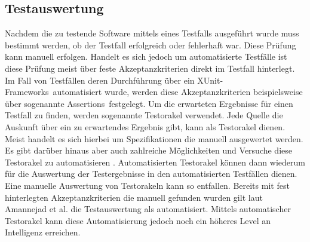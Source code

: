 \subsection{Testauswertung}
\label{subsec:testauswertung}
Nachdem die zu testende Software mittels eines Testfalls ausgeführt wurde muss bestimmt werden, ob der Testfall erfolgreich oder fehlerhaft war. Diese Prüfung kann manuell erfolgen. Handelt es sich jedoch um automatisierte Testfälle ist diese Prüfung meist über feste Akzeptanzkriterien direkt im Testfall hinterlegt. Im Fall von Testfällen deren Durchführung über ein \grq XUnit-Frameworks\grq\ automatisiert wurde, werden diese Akzeptanzkriterien beispielsweise über sogenannte \grq Assertions\grq\ festgelegt.
Um die erwarteten Ergebnisse für einen Testfall zu finden, werden sogenannte Testorakel verwendet.
Jede Quelle die Auskunft über ein zu erwartendes Ergebnis gibt, kann als Testorakel dienen.
Meist handelt es sich hierbei um Spezifikationen die manuell ausgewertet werden.
Es gibt darüber hinaus aber auch zahlreiche Möglichkeiten und Versuche diese Testorakel zu automatisieren \cite{memon_automated_2000} \cite{richardson_specification-based_1992} \cite{shahamiri_comparative_2009}.
Automatisierten Testorakel können dann wiederum für die Auswertung der Testergebnisse in den automatisierten Testfällen dienen. Eine manuelle Auswertung von Testorakeln kann so entfallen.
Bereits mit fest hinterlegten Akzeptanzkriterien die manuell gefunden wurden gilt laut Amannejad et al. \cite{amannejad_search-based_2014} die Testauswertung als automatisiert. Mittels automatischer Testorakel kann diese Automatisierung jedoch noch ein höheres Level an Intelligenz erreichen. 




